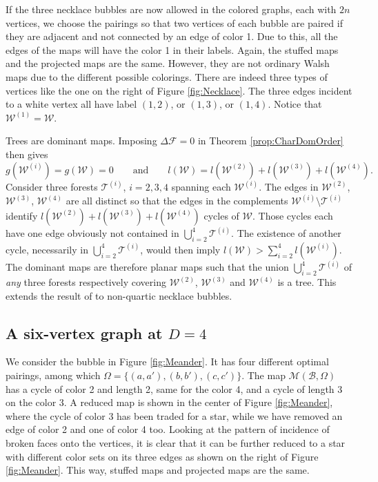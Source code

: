 \documentclass[aps,prd,10pt,notitlepage,nofootinbib,superscriptaddress,showkeys,showpacs]{revtex4-1}
\begin{document}
If the three necklace bubbles are now allowed in the colored graphs, each with $2n$ vertices, we choose the pairings so that two vertices of each bubble are paired if they are adjacent and not connected by an edge of color 1. Due to this, all the edges of the maps will have the color 1 in their labels. Again, the stuffed maps and the projected maps are the same. However, they are not ordinary Walsh maps due to the different possible colorings. There are indeed three types of vertices like the one on the right of Figure \ref{fig:Necklace}. The three edges incident to a white vertex all have label $(1, 2)$, or $(1, 3)$, or $(1, 4)$. Notice that ${\mathcal{W}}^{(1)} = {\mathcal{W}}$.

Trees are dominant maps. Imposing $\Delta{\mathcal{F}}=0$ in Theorem \ref{prop:CharDomOrder} then gives 
\begin{equation}
g({\mathcal{W}}^{(i)})=g({\mathcal{W}})=0 \qquad \text{and} \qquad l({\mathcal{W}})=l({\mathcal{W}}^{(2)})+l({\mathcal{W}}^{(3)})+l({\mathcal{W}}^{(4)}).
\end{equation}
Consider three forests ${\mathcal{T}}^{(i)}$, $i=2, 3, 4$ spanning each ${\mathcal{W}}^{(i)}$. The edges in ${\mathcal{W}}^{(2)}$, ${\mathcal{W}}^{(3)}$, ${\mathcal{W}}^{(4)}$ are all distinct so that the edges in the complements ${\mathcal{W}}^{(i)}\setminus {\mathcal{T}}^{(i)}$ identify $l({\mathcal{W}}^{(2)})+l({\mathcal{W}}^{(3)})+l({\mathcal{W}}^{(4)})$ cycles of ${\mathcal{W}}$. Those cycles each have one edge obviously not contained in $\bigcup_{i=2}^4 {\mathcal{T}}^{(i)}$. The existence of another cycle, necessarily in $\bigcup_{i=2}^4 {\mathcal{T}}^{(i)}$, would then imply $l({\mathcal{W}})>\sum_{i=2}^4 l({\mathcal{W}}^{(i)})$. The dominant maps are therefore planar maps such that the union $\bigcup_{i=2}^4{\mathcal{T}}^{(i)}$ of \emph{any} three forests respectively covering ${\mathcal{W}}^{(2)}$, ${\mathcal{W}}^{(3)}$ and ${\mathcal{W}}^{(4)}$ is a tree. This extends the result of \cite{Melonoplanar} to non-quartic necklace bubbles.

\subsection{A six-vertex graph at $D=4$} \label{sec:6VertexD=4}

We consider the bubble in Figure \ref{fig:Meander}. It has four different optimal pairings, among which $\Omega = \{(a,a'),(b,b'),(c,c')\}$. The map ${\mathcal{M}}({\mathcal{B}}, \Omega)$ has a cycle of color 2 and length 2, same for the color 4, and a cycle of length 3 on the color 3. A reduced map is shown in the center of Figure \ref{fig:Meander}, where the cycle of color 3 has been traded for a star, while we have removed an edge of color 2 and one of color 4 too. Looking at the pattern of incidence of broken faces onto the vertices, it is clear that it can be further reduced to a star with different color sets on its three edges as shown on the right of Figure \ref{fig:Meander}. This way, stuffed maps and projected maps are the same.
\end{document}

